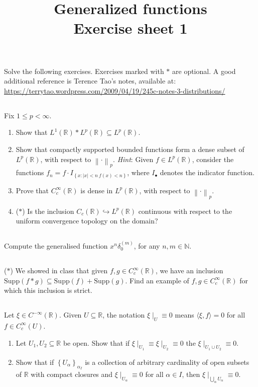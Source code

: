 \documentclass[11pt, reqno,a4paper, twoside]{amsproc}
\title{Generalized functions\\Exercise sheet 1}
\newcommand{\supp}{\mathrm{Supp}}
\newcommand{\dbN}{\mathbb N}
\newcommand{\dbR}{\mathbb R}
\newcommand{\gen}[1]{\langle{#1}\rangle}
\newcommand{\set}[1]{\left\{{#1}\right\}}
\newcommand{\norm}[1]{\left\|#1\right\|}
\newcommand{\abs}[1]{\left|#1\right|}
\begin{document}
\maketitle

Solve the following exercises. Exercises marked with $*$ are optional. A good additional reference is Terence Tao's notes, available at: 
\url{https://terrytao.wordpress.com/2009/04/19/245c-notes-3-distributions/}
\subsection{}Fix $1\le p<\infty$.
\begin{enumerate}\renewcommand{\theenumi}{\alph{enumi}}
\item 
Show that $L^1(\dbR)\ast L^p(\dbR)\subseteq L^p(\dbR)$.
\item 
Show that compactly supported bounded functions form a dense subset of $L^p(\dbR)$, with respect to $\norm{\cdot}_p$. \textit{Hint}: Given $f\in L^p(\dbR)$, consider the functions $f_n=f\cdot I_{\set{x:\abs{x}<n\:f(x)<n}}$, where $I_\bullet$ denotes the indicator function.
\item 
Prove that $C_c^\infty(\dbR)$ is dense in $L^p(\dbR)$, with respect to $\norm{\cdot}_p$.
\item ($*$) 
Is the inclusion $C_c(\dbR)\hookrightarrow L^p(\dbR)$ continuous with respect to the uniform convergence topology on the domain?
\end{enumerate}

\subsection{} Compute the generalised function $x^n\delta_0^{(m)}$, for any $n,m\in\dbN$.

\subsection{} ($*$) We showed in class that given $f,g\in C_c^\infty(\dbR)$, we have an inclusion $\supp(f\ast g)\subseteq \supp(f)+\supp (g)$. Find an example of $f,g\in C_c^\infty(\dbR)$ for which this inclusion is strict.

\subsection{}Let $\xi\in C^{-\infty}(\dbR)$. Given $U\subseteq\dbR$, the notation $\xi\mid_U\equiv 0$ means $\gen{\xi,f}=0$ for all $f\in C_c^\infty(U)$. 
\begin{enumerate}
\item  Let $U_1,U_2\subseteq\dbR$ be open. Show that if $\xi\mid_{U_1}\equiv\xi\mid_{U_2}\equiv 0$ the $\xi\mid_{U_1\cup U_2}\equiv 0$.
\item Show that if $\set{U_\alpha}_{\alpha_I}$ is a collection of arbitrary cardinality of open subsets of $\dbR$ with compact closures and $\xi\mid_{U_\alpha}\equiv 0$ for all $\alpha\in I$, then $\xi\mid_{\bigcup_\alpha U_\alpha}\equiv 0$. 
\end{enumerate}
\end{document}
